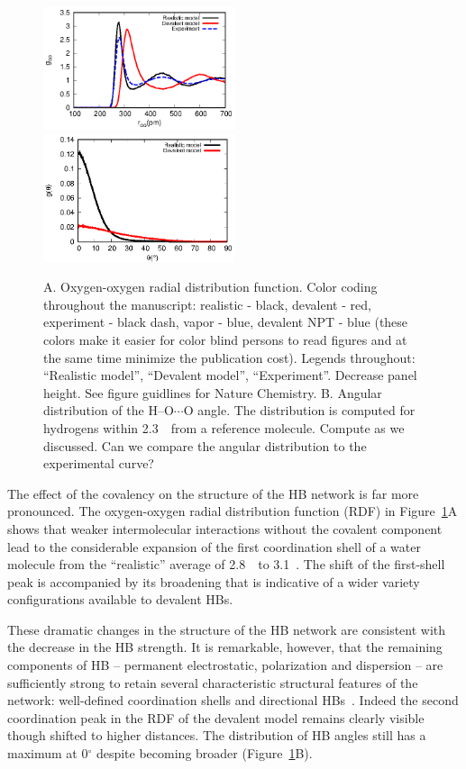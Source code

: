 \documentclass[prl,twocolumn,showpacs]{revtex4}
\begin{document}
\begin{figure}
\includegraphics[width=0.5\textwidth]{new_rdf}
\includegraphics[width=0.5\textwidth]{new_adf}
\caption{A. Oxygen-oxygen radial distribution function. \new Color coding throughout the manuscript: realistic - black, devalent - red, experiment - black dash, vapor - blue, devalent NPT - blue (these colors make it easier for color blind persons to read figures and at the same time minimize the publication cost). Legends throughout: ``Realistic model'', ``Devalent model'', ``Experiment''. Decrease panel height. See figure guidlines for Nature Chemistry. \old B. Angular distribution of the H--O$\cdots$O angle. The distribution is computed for hydrogens within 2.3~\Ang\ from a reference molecule. \new Compute as we discussed. Can we compare the angular distribution to the experimental curve? \old} \label{Fig:RDF}
\end{figure}

The effect of the covalency on the structure of the HB network is far more pronounced. The oxygen-oxygen radial distribution function (RDF) in Figure~\ref{Fig:RDF}A shows that weaker intermolecular interactions without the covalent component lead to the considerable expansion of the first coordination shell of a water molecule from the ``realistic'' average of 2.8~\Ang\ to 3.1~\Ang. The shift of the first-shell peak is accompanied by its broadening that is indicative of a wider variety configurations available to devalent HBs. 

These dramatic changes in the structure of the HB network are consistent with the decrease in the HB strength. It is remarkable, however, that the remaining components of HB -- permanent electrostatic, polarization and dispersion -- are sufficiently strong to retain several characteristic structural features of the network: well-defined coordination shells and directional HBs~\cite{arunan2011definition}.
%
%
Indeed the second coordination peak in the RDF of the devalent model remains clearly visible though shifted to higher distances. The distribution of HB angles still has a maximum at 0$^\circ$ despite becoming broader (Figure~\ref{Fig:RDF}B). 
\end{document}
